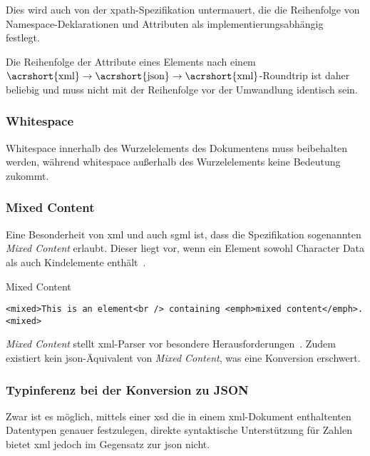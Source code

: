 Dies wird auch von der \acrshort{xpath}-Spezifikation untermauert, die die Reihenfolge von Namespace-Deklarationen und Attributen als implementierungsabhängig festlegt.~\cite[Abschnitt~5]{clark1999xpath1} 

Die Reihenfolge der Attribute eines Elements nach einem $\text{\acrshort{xml}}\rightarrow{}\text{\acrshort{json}}\rightarrow{}\text{\acrshort{xml}}$-Roundtrip ist daher beliebig und muss nicht mit der Reihenfolge vor der Umwandlung identisch sein.

\subsubsection{Whitespace}

Whitespace innerhalb des Wurzelelements des Dokumentens muss beibehalten werden, während whitespace außerhalb des Wurzelelements keine Bedeutung zukommt.~\cite[Abschnitt~2.1]{boyer2001c14n}

\subsubsection{Mixed Content}
\label{sec:mixedcontent}

Eine Besonderheit von \acrshort{xml} und auch \acrshort{sgml} ist, dass die Spezifikation sogenannten \emph{Mixed Content} erlaubt. Dieser liegt vor, wenn ein Element sowohl Character Data als auch Kindelemente enthält~\cite[Abschnitt 3.2.2]{maler2008xml}.

\begin{example} Mixed Content
    \begin{verbatim}
<mixed>This is an element<br /> containing <emph>mixed content</emph>.<mixed>
    \end{verbatim}
\end{example}

\emph{Mixed Content} stellt \acrshort{xml}-Parser vor besondere Herausforderungen~\cite{mcgrath2002mixedcontent}. Zudem existiert kein \acrshort{json}-Äquivalent von \emph{Mixed Content}, was eine Konversion erschwert.

\subsubsection{Typinferenz bei der Konversion zu JSON}

Zwar ist es möglich, mittels einer \acrfull{xsd} die in einem \acrshort{xml}-Dokument enthaltenten Datentypen genauer festzulegen, direkte syntaktische Unterstützung für Zahlen bietet \acrshort{xml} jedoch im Gegensatz zur \acrlong{json} nicht.

